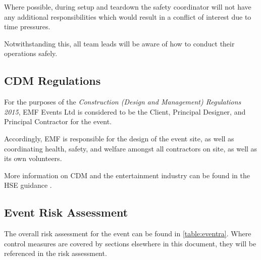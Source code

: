 Where possible, during setup and teardown the safety coordinator will not have
any additional responsibilities which would result in a conflict of interest due
to time pressures.

Notwithstanding this, all team leads will be aware of how to conduct their
operations safely.

\subsection{CDM Regulations}

For the purposes of the \textit{Construction (Design and Management) Regulations 2015},
EMF Events Ltd is considered to be the Client, Principal Designer,
and Principal Contractor for the event.

Accordingly, EMF is responsible for the design of the event site, as well as
coordinating health, safety, and welfare amongst all contractors on site, as well
as its own volunteers.

More information on CDM and the entertainment industry can be found in the HSE
guidance \cite{cdmguidance}.

\subsection{Event Risk Assessment}
The overall risk assessment for the event can be found in \cref{table:eventra}.
Where control measures are covered by sections elsewhere in this document, they
will be referenced in the risk assessment.


